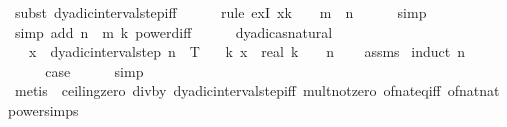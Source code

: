 \begin{isabellebody}
\ {\isacharparenleft}{\kern0pt}subst\ dyadic{\isacharunderscore}{\kern0pt}interval{\isacharunderscore}{\kern0pt}step{\isacharunderscore}{\kern0pt}iff{\isacharparenright}{\kern0pt}\isanewline
\ \ \ \ \isamarkupfalse%
\ {\isacharparenleft}{\kern0pt}rule\ exI{\isacharbrackleft}{\kern0pt}\ x{\isacharequal}{\kern0pt}{\isachardoublequoteopen}k\ {\isacharasterisk}{\kern0pt}\ {}\ {\isacharcircum}{\kern0pt}\ {\isacharparenleft}{\kern0pt}m\ {\isacharminus}{\kern0pt}\ n{\isacharparenright}{\kern0pt}{\isachardoublequoteclose}{\isacharbrackright}{\kern0pt}{\isacharparenright}{\kern0pt}\isanewline
\ \ \ \ \isamarkupfalse%
\ simp\isanewline
\ \ \ \ \isamarkupfalse%
\ {\isacharparenleft}{\kern0pt}simp\ add{\isacharcolon}{\kern0pt}\ {\isacartoucheopen}n\ {\isasymle}\ m{\isacartoucheclose}\ k{\isacharparenleft}{\kern0pt}{}{\isacharparenright}{\kern0pt}\ power{\isacharunderscore}{\kern0pt}diff{\isacharparenright}{\kern0pt}\isanewline
\ \ \ \ \isamarkupfalse%
\isanewline
{}\isamarkupfalse%
%
\endisatagproof
{\isafoldproof}%
%
\isadelimproof
%
\endisadelimproof
\isanewline
\isanewline
{}\isamarkupfalse%
\ dyadic{\isacharunderscore}{\kern0pt}as{\isacharunderscore}{\kern0pt}natural{\isacharcolon}{\kern0pt}\isanewline
\ \ \ {\isachardoublequoteopen}x\ {\isasymin}\ dyadic{\isacharunderscore}{\kern0pt}interval{\isacharunderscore}{\kern0pt}step\ n\ {}\ T{\isachardoublequoteclose}\isanewline
\ \ \ {\isachardoublequoteopen}{\isasymexists}{\isacharbang}{\kern0pt}k{\isachardot}{\kern0pt}\ x\ {\isacharequal}{\kern0pt}\ real\ k\ {\isacharslash}{\kern0pt}\ {}\ {\isacharcircum}{\kern0pt}\ n{\isachardoublequoteclose}\isanewline
%
\isadelimproof
\ \ %
\endisadelimproof
%
\isatagproof
{}\isamarkupfalse%
\ assms\isanewline
{}\isamarkupfalse%
\ {\isacharparenleft}{\kern0pt}induct\ n{\isacharparenright}{\kern0pt}\isanewline
\ \ \isamarkupfalse%
\ {}\isanewline
\ \ \isamarkupfalse%
\ \isamarkupfalse%
\ {\isacharquery}{\kern0pt}case\isanewline
\ \ \ \ \isamarkupfalse%
\ simp\isanewline
\ \ \ \ \isamarkupfalse%
\ {\isacharparenleft}{\kern0pt}metis\ {}\ ceiling{\isacharunderscore}{\kern0pt}zero\ div{\isacharunderscore}{\kern0pt}by{\isacharunderscore}{\kern0pt}{}\ dyadic{\isacharunderscore}{\kern0pt}interval{\isacharunderscore}{\kern0pt}step{\isacharunderscore}{\kern0pt}iff\ mult{\isacharunderscore}{\kern0pt}not{\isacharunderscore}{\kern0pt}zero\ of{\isacharunderscore}{\kern0pt}nat{\isacharunderscore}{\kern0pt}eq{\isacharunderscore}{\kern0pt}iff\ of{\isacharunderscore}{\kern0pt}nat{\isacharunderscore}{\kern0pt}nat\ power{\isachardot}{\kern0pt}simps{\isacharparenleft}{\kern0pt}{}{\isacharparenright}{\kern0pt}{\isacharparenright}{\kern0pt}\isanewline

\end{isabellebody}

